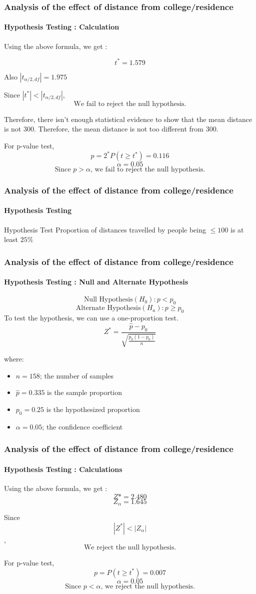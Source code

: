 \documentclass{beamer}
\begin{document}
\begin{frame}
\frametitle{Analysis of the effect of distance
from college/residence}
\framesubtitle{Hypothesis Testing : Calculation}
\large Using the above formula, we get :

\[ t^* = 1.579\]

Also $|t_{\alpha/2, df}| = 1.975$

Since $ |t^*| < |t_{\alpha/2, df}|$,
\[\text{We fail to reject the null hypothesis.}\]

Therefore, there isn't enough statistical evidence to show that the mean distance is not $300$. Therefore, the mean distance is not too different from $300$.

For p-value test,
\[p = 2^*P(t \geq t^*) = 0.116\]
\[\alpha = 0.05\]
\[\text{Since $p > \alpha$, we fail to reject the null hypothesis.}\]

\end{frame}

\begin{frame}
\frametitle{Analysis of the effect of distance
from college/residence}
\framesubtitle{Hypothesis Testing}
\begin{block}{Hypothesis Test}
Proportion of distances travelled by people being $\leq 100$ is at least $25\%$
\end{block}
\end{frame}

\begin{frame}
\frametitle{Analysis of the effect of distance
from college/residence}
\framesubtitle{Hypothesis Testing : Null and Alternate Hypothesis}
$$\text{Null Hypothesis}(H_0): p < p_0$$
$$\text{Alternate Hypothesis}(H_a): p \geq p_0$$  
To test the hypothesis, we can use a one-proportion test.
\[ Z^* = \frac{\hat{p} - p_0}{\sqrt{\frac{p_0(1 - p_0)}{n}}} \]

where:
\begin{itemize}
    \item $n = 158$; the number of samples
    \item $\hat{p} = 0.335$ is the sample proportion
    \item $p_0 = 0.25$ is the hypothesized proportion
    \item $\alpha = 0.05$; the confidence coefficient
\end{itemize}
\end{frame}

\begin{frame}
\frametitle{Analysis of the effect of distance
from college/residence}
\framesubtitle{Hypothesis Testing : Calculations}
\large Using the above formula, we get :
\[ Z* = 2.480\]
\[ Z_{\alpha} = 1.645\]

Since 
\[ |Z^*| < |Z_{\alpha}|\],
\[\text{We reject the null hypothesis.}\]

For p-value test,
\[p = P(t \geq t^*) = 0.007\]
\[\alpha = 0.05\]
\[\text{Since $p < \alpha$, we reject the null hypothesis.}\]
\end{frame}
\end{document}
